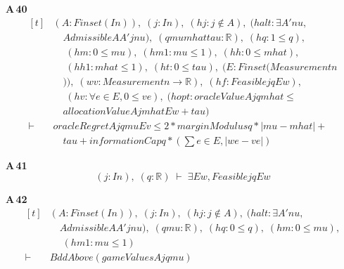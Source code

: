 \noindent\textbf{A\,40}\quad{}
{\footnotesize\[ \begin{aligned}[t]
&(\mathit{A} : \mathit{Finset} (\mathit{I} \mathit{n})),\; (\mathit{j} : \mathit{I} \mathit{n}),\; (\mathit{hj} : \mathit{j} \notin \mathit{A}),\; (\mathit{halt} : \exists \mathit{A'} \mathit{nu},\\
&\quad \mathit{Admissible} \mathit{A} \mathit{A'} \mathit{j} \mathit{nu}),\; (\mathit{q} \mathit{mu} \mathit{mhat} \mathit{tau} : \mathbb{R} ),\; (\mathit{hq} : 1 \leq \mathit{q}),\\
&\quad \; (\mathit{hm} : 0 \leq \mathit{mu}),\; (\mathit{hm1} : \mathit{mu} \leq 1),\; (\mathit{hh} : 0 \leq \mathit{mhat}),\\
&\quad \; (\mathit{hh1} : \mathit{mhat} \leq 1),\; (\mathit{ht} : 0 \leq \mathit{tau}),\; (\mathit{E} : \mathit{Finset} (\mathit{Measurement} \mathit{n}\\
&\quad )),\; (\mathit{w} \mathit{v} : \mathit{Measurement} \mathit{n} \to \mathbb{R} ),\; (\mathit{hf} : \mathit{Feasible} \mathit{j} \mathit{q} \mathit{E} \mathit{w}),\\
&\quad \; (\mathit{hv} : \forall \mathit{e} \in \mathit{E},0 \leq \mathit{v} \mathit{e}),\; (\mathit{hopt} : \mathit{oracleValue} \mathit{A} \mathit{j} \mathit{q} \mathit{mhat} \leq\\
&\quad \mathit{allocationValue} \mathit{A} \mathit{j} \mathit{mhat} \mathit{E} \mathit{w}+\mathit{tau})\\
\vdash\;&\mathit{oracleRegret} \mathit{A} \mathit{j} \mathit{q} \mathit{mu} \mathit{E} \mathit{v} \leq 2*\mathit{marginModulus} \mathit{q}*|\mathit{mu}-\mathit{mhat}|+\\
&\quad \mathit{tau}+ \mathit{informationCap} \mathit{q}*(\textstyle\sum \mathit{e} \in \mathit{E},|\mathit{w} \mathit{e}-\mathit{v} \mathit{e}|)
\end{aligned} \]}

\noindent\textbf{A\,41}\quad{}
{\footnotesize\[ (\mathit{j} : \mathit{I} \mathit{n}),\; (\mathit{q} : \mathbb{R} ) \;\vdash\; \exists \mathit{E} \mathit{w}, \mathit{Feasible} \mathit{j} \mathit{q} \mathit{E} \mathit{w} \]}

\noindent\textbf{A\,42}\quad{}
{\footnotesize\[ \begin{aligned}[t]
&(\mathit{A} : \mathit{Finset} (\mathit{I} \mathit{n})),\; (\mathit{j} : \mathit{I} \mathit{n}),\; (\mathit{hj} : \mathit{j} \notin \mathit{A}),\; (\mathit{halt} : \exists \mathit{A'} \mathit{nu},\\
&\quad \mathit{Admissible} \mathit{A} \mathit{A'} \mathit{j} \mathit{nu}),\; (\mathit{q} \mathit{mu} : \mathbb{R} ),\; (\mathit{hq} : 0 \leq \mathit{q}),\; (\mathit{hm} : 0 \leq \mathit{mu}),\\
&\quad \; (\mathit{hm1} : \mathit{mu} \leq 1)\\
\vdash\;&\mathit{BddAbove} (\mathit{gameValues} \mathit{A} \mathit{j} \mathit{q} \mathit{mu})
\end{aligned} \]}


